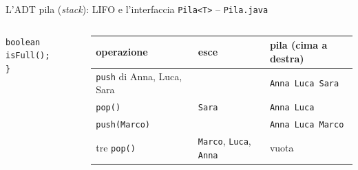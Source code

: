 \documentclass[10pt,aspectratio=169,xcolor={table}]{beamer}
\begin{document}
\begin{frame}[fragile]{L'ADT pila (\emph{stack}): LIFO e l'interfaccia \texttt{Pila<T>} -- \texttt{Pila.java}}
\begin{columns}[T]
\begin{lstlisting}[basicstyle=\ttfamily\scriptsize]
    boolean isFull();
}
\end{lstlisting}
\begin{center}
\scriptsize\renewcommand{\arraystretch}{1.2}\setlength{\tabcolsep}{4pt}
\begin{tabular}{|>{\raggedright\arraybackslash}p{2.3cm}|>{\raggedright\arraybackslash}p{1.6cm}|>{\raggedright\arraybackslash}p{2.3cm}|}
\hline
\textbf{operazione} & \textbf{esce} & \textbf{pila (cima a destra)} \\
\hline
\texttt{push} di Anna, Luca, Sara & & \texttt{Anna Luca Sara} \\
\hline
\texttt{pop()} & \texttt{Sara} & \texttt{Anna Luca} \\
\hline
\texttt{push(Marco)} & & \texttt{Anna Luca Marco} \\
\hline
tre \texttt{pop()} & \texttt{Marco}, \texttt{Luca}, \texttt{Anna} & vuota \\
\hline
\end{tabular}
\end{center}
\end{columns}
\end{frame}
\end{document}

